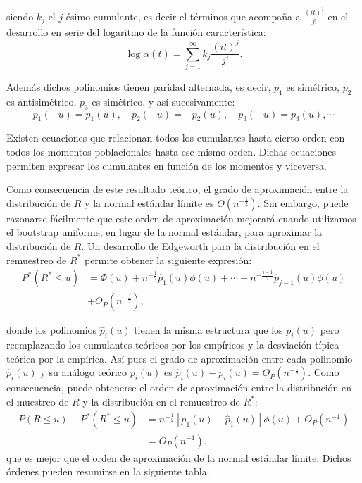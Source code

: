 \documentclass[]{book}
\theoremstyle{definition}
\theoremstyle{definition}
\theoremstyle{definition}
\theoremstyle{remark}
\begin{document}
siendo \(k_j\) el \(j\)-ésimo cumulante, es decir el términos que
acompaña a \(\frac{\left( it \right)^{j}}{j!}\) en el desarrollo en
serie del logaritmo de la función característica:
\[\log \alpha \left( t \right) =\sum_{j=1}^{\infty }k_j\frac{\left( it \right)
^{j}}{j!}.\]

Además dichos polinomios tienen paridad alternada, es decir, \(p_1\) es
simétrico, \(p_2\) es antisimétrico, \(p_3\) es simétrico, y así
sucesivamente:
\[p_1\left( -u \right) = p_1\left( u \right),\quad p_2\left( -u \right)
= -p_2\left( u \right),\quad p_3\left( -u \right) = p_3\left( u \right)
,\cdots\]

Existen ecuaciones que relacionan todos los cumulantes hasta cierto
orden con todos los momentos poblacionales hasta ese mismo orden. Dichas
ecuaciones permiten expresar los cumulantes en función de los momentos y
viceversa.

Como consecuencia de este resultado teórico, el grado de aproximación
entre la distribución de \(R\) y la normal estándar límite es
\(O (n^{-\frac{1}{2}})\). Sin embargo, puede razonarse fácilmente que
este orden de aproximación mejorará cuando utilizamos el bootstrap
uniforme, en lugar de la normal estándar, para aproximar la distribución
de \(R\). Un desarrollo de Edgeworth para la distribución en el
remuestreo de \(R^{\ast}\) permite obtener la siguiente expresión:
\[\begin{aligned}
P^{\ast}\left( R^{\ast}\leq u \right) &= \Phi \left( u \right) +n^{-\frac{1}{2}
}\hat{p}_1\left( u \right) \phi \left( u \right) +\cdots +n^{-\frac{j-1}{2}}
\hat{p}_{j-1}\left( u \right) \phi \left( u \right) \\
&+ O_{P}\left( n^{-\frac{j}{2}} \right),
\end{aligned}\]

donde los polinomios \(\hat{p}_i\left( u \right)\) tienen la misma
estructura que los \(p_i\left( u \right)\) pero reemplazando los
cumulantes teóricos por los empíricos y la desviación típica teórica por
la empírica. Así pues el grado de aproximación entre cada polinomio
\(\hat{p}_i( u )\) y su análogo teórico \(p_i( u )\) es
\(\hat{p}_i( u ) -p_i( u ) = O_{P}( n^{-\frac{1}{2}} )\). Como
consecuencia, puede obtenerse el orden de aproximación entre la
distribución en el muestreo de \(R\) y la distribución en el remuestreo
de \(R^{\ast}\): \[\begin{aligned}
P\left( R\leq u \right) -P^{\ast}\left( R^{\ast}\leq u \right) &=  n^{-\frac{1}{
2}}\left[ p_1\left( u \right) -\hat{p}_1\left( u \right) \right] \phi
\left( u \right) +O_{P}\left( n^{-1} \right) \\
&=  O_{P}\left( n^{-1} \right),\end{aligned}\]que es mejor que el orden
de aproximación de la normal estándar límite. Dichos órdenes pueden
resumirse en la siguiente tabla.
\end{document}
